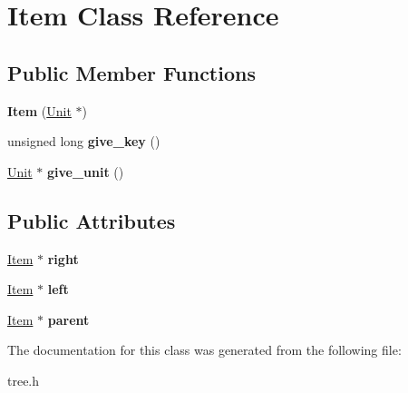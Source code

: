 \hypertarget{class_item}{\section{Item Class Reference}
\label{class_item}
}
\subsection*{Public Member Functions}
\begin{DoxyCompactItemize}
\item 
\hypertarget{class_item_a28172fb163df01b3a78fffb0cef52da5}{{\bfseries Item} (\hyperlink{class_unit}{Unit} $\ast$)}\label{class_item_a28172fb163df01b3a78fffb0cef52da5}

\item 
\hypertarget{class_item_af1688aec8f829ebd351b47e4862f33f1}{unsigned long {\bfseries give\-\_\-key} ()}\label{class_item_af1688aec8f829ebd351b47e4862f33f1}

\item 
\hypertarget{class_item_a6bc1591d0e42a3e7a4e9af4e52bb5724}{\hyperlink{class_unit}{Unit} $\ast$ {\bfseries give\-\_\-unit} ()}\label{class_item_a6bc1591d0e42a3e7a4e9af4e52bb5724}

\end{DoxyCompactItemize}
\subsection*{Public Attributes}
\begin{DoxyCompactItemize}
\item 
\hypertarget{class_item_aed3b55d1a190f39ab686b9d6b183f20e}{\hyperlink{class_item}{Item} $\ast$ {\bfseries right}}\label{class_item_aed3b55d1a190f39ab686b9d6b183f20e}

\item 
\hypertarget{class_item_aab6663ae238e207a73baee6752fa72be}{\hyperlink{class_item}{Item} $\ast$ {\bfseries left}}\label{class_item_aab6663ae238e207a73baee6752fa72be}

\item 
\hypertarget{class_item_a5bf3ccf309da1b6f770fc9acbb6b669d}{\hyperlink{class_item}{Item} $\ast$ {\bfseries parent}}\label{class_item_a5bf3ccf309da1b6f770fc9acbb6b669d}

\end{DoxyCompactItemize}


The documentation for this class was generated from the following file\-:\begin{DoxyCompactItemize}
\item 
tree.\-h\end{DoxyCompactItemize}
